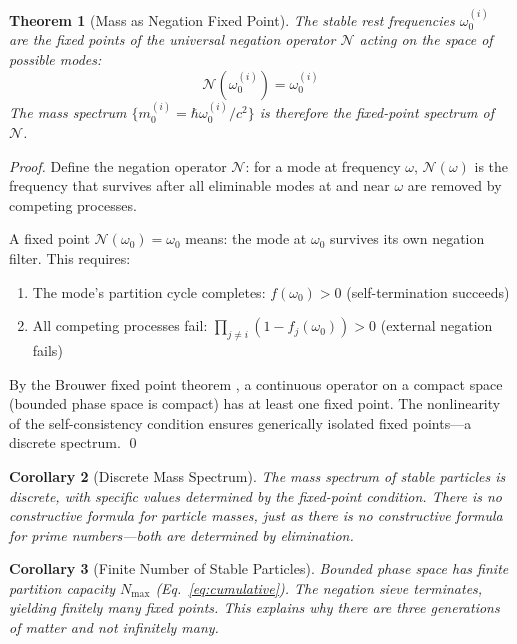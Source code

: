 \documentclass[twocolumn,10pt,a4paper]{article}
\newtheorem{theorem}{Theorem}[section]
\newtheorem{corollary}[theorem]{Corollary}
\theoremstyle{definition}
\theoremstyle{remark}
\begin{document}
\begin{theorem}[Mass as Negation Fixed Point]
\label{thm:mass-fixedpoint}
The stable rest frequencies $\omega_0^{(i)}$ are the fixed points of the universal negation operator $\mathcal{N}$ acting on the space of possible modes:
\begin{equation}
    \mathcal{N}(\omega_0^{(i)}) = \omega_0^{(i)}
\end{equation}
The mass spectrum $\{m_0^{(i)} = \hbar\omega_0^{(i)}/c^2\}$ is therefore the fixed-point spectrum of $\mathcal{N}$.
\end{theorem}

\begin{proof}
Define the negation operator $\mathcal{N}$: for a mode at frequency $\omega$, $\mathcal{N}(\omega)$ is the frequency that survives after all eliminable modes at and near $\omega$ are removed by competing processes.

A fixed point $\mathcal{N}(\omega_0) = \omega_0$ means: the mode at $\omega_0$ survives its own negation filter. This requires:
\begin{enumerate}
    \item The mode's partition cycle completes: $f(\omega_0) > 0$ (self-termination succeeds)
    \item All competing processes fail: $\prod_{j \neq i} (1 - f_j(\omega_0)) > 0$ (external negation fails)
\end{enumerate}

By the Brouwer fixed point theorem \citep{brouwer1911}, a continuous operator on a compact space (bounded phase space is compact) has at least one fixed point. The nonlinearity of the self-consistency condition ensures generically isolated fixed points---a discrete spectrum. \qed
\end{proof}

\begin{corollary}[Discrete Mass Spectrum]
The mass spectrum of stable particles is discrete, with specific values determined by the fixed-point condition. There is no constructive formula for particle masses, just as there is no constructive formula for prime numbers---both are determined by elimination.
\end{corollary}

\begin{corollary}[Finite Number of Stable Particles]
Bounded phase space has finite partition capacity $N_{\max}$ (Eq.~\ref{eq:cumulative}). The negation sieve terminates, yielding finitely many fixed points. This explains why there are three generations of matter and not infinitely many.
\end{corollary}
\end{document}
